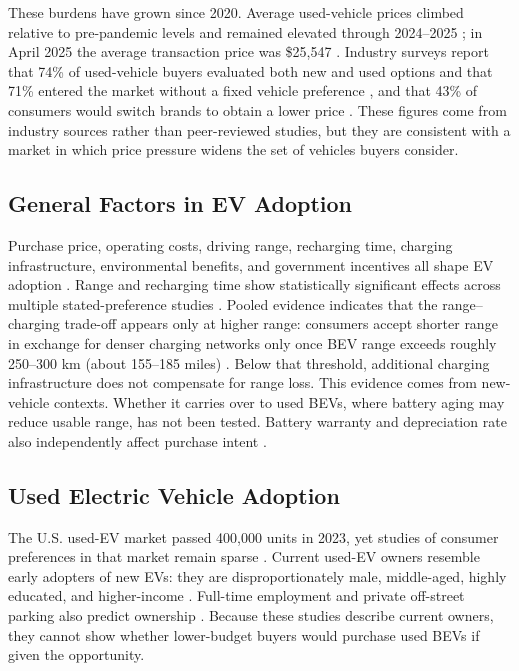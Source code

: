 \documentclass[a4paper,fleqn]{cas-sc}   %
\begin{document}
These burdens have grown since 2020. Average used-vehicle prices climbed relative to pre-pandemic levels and remained elevated through 2024--2025 \parencite{cox2024usedvehicle_prices}; in April 2025 the average transaction price was \$25,547 \parencite{kbb2025usedcar_price}. Industry surveys report that 74\% of used-vehicle buyers evaluated both new and used options and that 71\% entered the market without a fixed vehicle preference \parencite{cox2025buyerjourney}, and that 43\% of consumers would switch brands to obtain a lower price \parencite{c4analytics2025pricesensitivity}. These figures come from industry sources rather than peer-reviewed studies, but they are consistent with a market in which price pressure widens the set of vehicles buyers consider.

\subsection{General Factors in EV Adoption}

Purchase price, operating costs, driving range, recharging time, charging infrastructure, environmental benefits, and government incentives all shape EV adoption \parencite{sagepub2020EVattributes}. Range and recharging time show statistically significant effects across multiple stated-preference studies \parencite{helveston2016EVpreferences}. Pooled evidence indicates that the range--charging trade-off appears only at higher range: consumers accept shorter range in exchange for denser charging networks only once BEV range exceeds roughly 250--300 km (about 155--185 miles) \parencite{trd2024metaregression}. Below that threshold, additional charging infrastructure does not compensate for range loss. This evidence comes from new-vehicle contexts. Whether it carries over to used BEVs, where battery aging may reduce usable range, has not been tested. Battery warranty and depreciation rate also independently affect purchase intent \parencite{trd2019batterywarranty}.

\subsection{Used Electric Vehicle Adoption}

The U.S. used-EV market passed 400,000 units in 2023, yet studies of consumer preferences in that market remain sparse \parencite{tandf2025usedEV}. Current used-EV owners resemble early adopters of new EVs: they are disproportionately male, middle-aged, highly educated, and higher-income \parencite{trd2024usedEV_concerns, trd2024usedEV_adoption}. Full-time employment and private off-street parking also predict ownership \parencite{trd2024usedEV_adoption}. Because these studies describe current owners, they cannot show whether lower-budget buyers would purchase used BEVs if given the opportunity.
\end{document}
